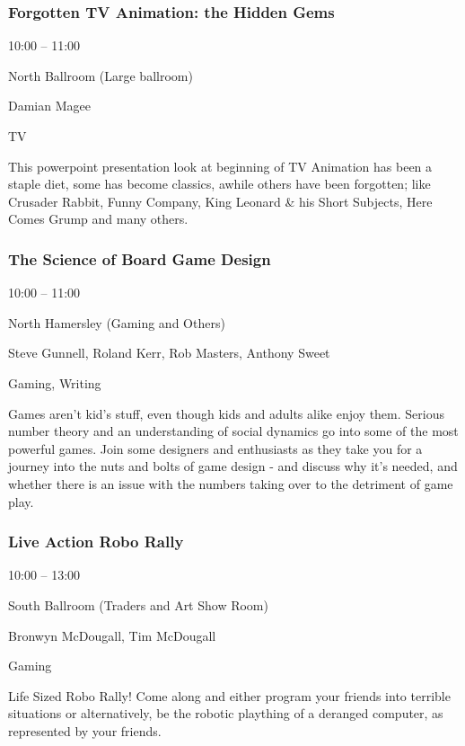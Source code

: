 \documentclass{scrreprt}
\begin{document}
\begin{multicols}{2}
\subsubsection*{Forgotten TV Animation: the Hidden Gems}\begin{description}
\setlength{\itemsep}{0pt}
\setlength{\parsep}{0pt}
\setlength{\parskip}{0pt}
\item[Time:]{10:00 -- 11:00}
\item[Venue:]{North Ballroom (Large ballroom)}
\item[People:]{Damian Magee}
\item[Tags:]{TV}\end{description}
This powerpoint presentation look at beginning of TV Animation has been a staple diet, some has become classics, awhile others have been forgotten; like Crusader Rabbit, Funny Company, King Leonard \& his Short Subjects, Here Comes Grump and many others.
\subsubsection*{The Science of Board Game Design}\begin{description}
\setlength{\itemsep}{0pt}
\setlength{\parsep}{0pt}
\setlength{\parskip}{0pt}
\item[Time:]{10:00 -- 11:00}
\item[Venue:]{North Hamersley (Gaming and Others)}
\item[People:]{Steve Gunnell, Roland Kerr, Rob Masters, Anthony Sweet}
\item[Tags:]{Gaming, Writing}\end{description}
Games aren't kid's stuff, even though kids and adults alike enjoy them. Serious number theory  and an understanding of social dynamics go into some of the most powerful games. Join some designers and enthusiasts as they take you for a journey into the nuts and bolts of game design - and discuss why it's needed, and whether there is an issue with the numbers taking over to the detriment of game play.
\subsubsection*{Live Action Robo Rally}\begin{description}
\setlength{\itemsep}{0pt}
\setlength{\parsep}{0pt}
\setlength{\parskip}{0pt}
\item[Time:]{10:00 -- 13:00}
\item[Venue:]{South Ballroom (Traders and Art Show Room)}
\item[People:]{Bronwyn McDougall, Tim McDougall}
\item[Tags:]{Gaming}\end{description}
Life Sized Robo Rally! Come along and either program your friends into terrible situations or alternatively, be the robotic plaything of a deranged computer, as represented by your friends.

\end{multicols}
\end{document}
